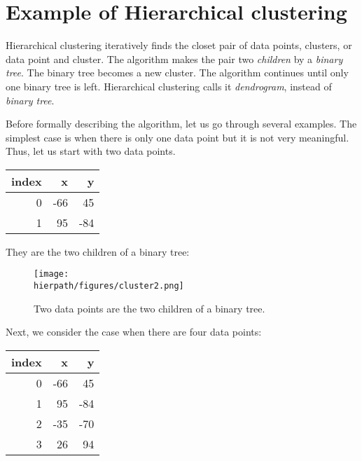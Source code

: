 
\section{Example of 
Hierarchical clustering}

Hierarchical clustering iteratively finds the closet pair of data
points, clusters, or data point and cluster. The algorithm makes the
pair two {\it children} by a {\it binary tree}.  The binary tree
becomes a new cluster.  The algorithm continues until only one binary
tree is left.  Hierarchical clustering calls it {\it dendrogram}, instead
of {\it binary tree}.

Before formally describing the algorithm, let us go through several
examples.  The simplest case is when there is only one data point but
it is not very meaningful. Thus, let us start with two data points.

\begin{table}[h]
\begin{tt}
\begin{tabular}{|r|rr|} \hline
{\bf index} &  {\bf x} & {\bf y} \\ \hline
0 &  -66  &  45 \\
1 & 95  &  -84 \\ \hline
\end{tabular}
\end{tt}
\end{table}

They are the two children of a binary tree:

\begin{figure}[h] \centering
{\texttt{[image: \\hierpath/figures/cluster2.png]}}
\caption{Two data points are the two children of a binary tree. }
\label{fig:hierarchical:cluster2}
\end{figure}

Next, we consider the case when there are four data points:

\begin{table}[h]
\begin{tt}
\begin{tabular}{|r|rr|} \hline
{\bf index} &  {\bf x} & {\bf y} \\ \hline
0 &  -66  &  45 \\
1 & 95  &  -84 \\
2 & -35  &  -70 \\
3 & 26  &  94 \\ \hline
\end{tabular}
\end{tt}
\end{table}


